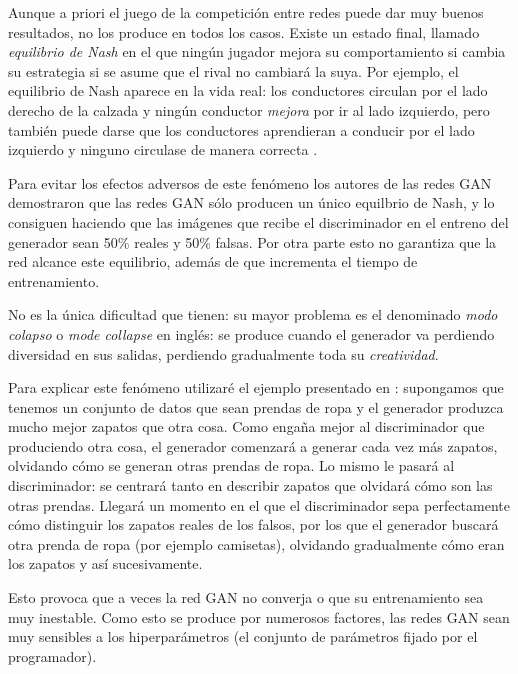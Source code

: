 \documentclass[../main.tex]{subfiles}
\begin{document}
Aunque a priori el juego de la competición entre redes puede dar muy buenos resultados, no los produce en todos los casos. Existe un estado final, llamado \textit{equilibrio de Nash} en el que ningún jugador mejora su comportamiento si cambia su estrategia si se asume que el rival no cambiará la suya. Por ejemplo, el equilibrio de Nash aparece en la vida real: los conductores circulan por el lado derecho de la calzada y ningún conductor \textit{mejora} por ir al lado izquierdo, pero también puede darse que los conductores aprendieran a conducir por el lado izquierdo y ninguno circulase de manera correcta \cite{Geron2019}. \newline

Para evitar los efectos adversos de este fenómeno los autores de las redes GAN demostraron que las redes GAN sólo producen un único equilbrio de Nash, y lo consiguen haciendo que las imágenes que recibe el discriminador en el entreno del generador sean 50\% reales y 50\% falsas. Por otra parte esto no garantiza que la red alcance este equilibrio, además de que incrementa el tiempo de entrenamiento. \newline

No es la única dificultad que tienen: su mayor problema es el denominado \textit{modo colapso} o \textit{mode collapse} en inglés: se produce cuando el generador va perdiendo diversidad en sus salidas, perdiendo gradualmente toda su \textit{creatividad}. \newline

Para explicar este fenómeno utilizaré el ejemplo presentado en \cite{Geron2019}: supongamos que tenemos un conjunto de datos que sean prendas de ropa y el generador produzca mucho mejor zapatos que otra cosa. Como engaña mejor al discriminador que produciendo otra cosa, el generador comenzará a generar cada vez más zapatos, olvidando cómo se generan otras prendas de ropa. Lo mismo le pasará al discriminador: se centrará tanto en describir zapatos que olvidará cómo son las otras prendas. Llegará un momento en el que el discriminador sepa perfectamente cómo distinguir los zapatos reales de los falsos, por los que el generador buscará otra prenda de ropa (por ejemplo camisetas), olvidando gradualmente cómo eran los zapatos y así sucesivamente. \newline

Esto provoca que a veces la red GAN no converja o que su entrenamiento sea muy inestable. Como esto se produce por numerosos factores, las redes GAN sean muy sensibles a los hiperparámetros (el conjunto de parámetros fijado por el programador). \newline
\end{document}

